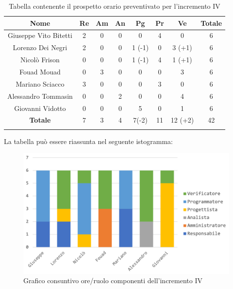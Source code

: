 			\begin{longtable}{|c|c|c|c|c|c|c|c}
				\hline
				\rowcolor{lighter-grayer}
				\textbf{Nome} & \textbf{Re} & \textbf{Am} & \textbf{An} & \textbf{Pg}  & \textbf{Pr}   & \textbf{Ve} & \textbf{Totale} \\
				\hline
				\endfirsthead
				\hline
				Giuseppe Vito Bitetti & 2 & 0 & 0 & 0 & 4 & 0 & 6\\
				\hline
				\hline
				Lorenzo Dei Negri & 2 & 0 & 0 & 1 (-1) & 0 & 3 (+1) & 6\\
				\hline
				\hline
				Nicolò Frison & 0 & 0 & 0 & 1 (-1) & 4 & 1 (+1) & 6\\
				\hline
				\hline
				Fouad Mouad & 0 & 3 & 0 & 0 & 0 & 3 & 6\\
				\hline
				\hline
				Mariano Sciacco & 3 & 0 & 0 & 0 & 3 & 0 & 6\\
				\hline
				\hline
				Alessandro Tommasin & 0 & 0 & 2 & 0 & 0 & 4 & 6\\
				\hline
				\hline
				Giovanni Vidotto & 0 & 0 & 0 & 5 & 0 & 1 & 6\\
				\hline 
				\textbf{Totale} & 7 &  3 & 4 & 7(-2) & 11  & 12 (+2) & 42 \\
				\hline 
				
				\caption{Tabella contenente il prospetto orario preventivato per l'incremento IV}
			\end{longtable}
			
			La tabella può essere riassunta nel seguente istogramma:
			
			\begin{figure}[H]
				\centering
				\includegraphics[width=0.8\linewidth]{images/consuntivo/ConsIncr4-1.png}
				\caption{Grafico consuntivo ore/ruolo componenti dell'incremento IV}
				\label{fig:consuntivo grafico suddivione ruoli incremento IV}
			\end{figure}
			\pagebreak
			
